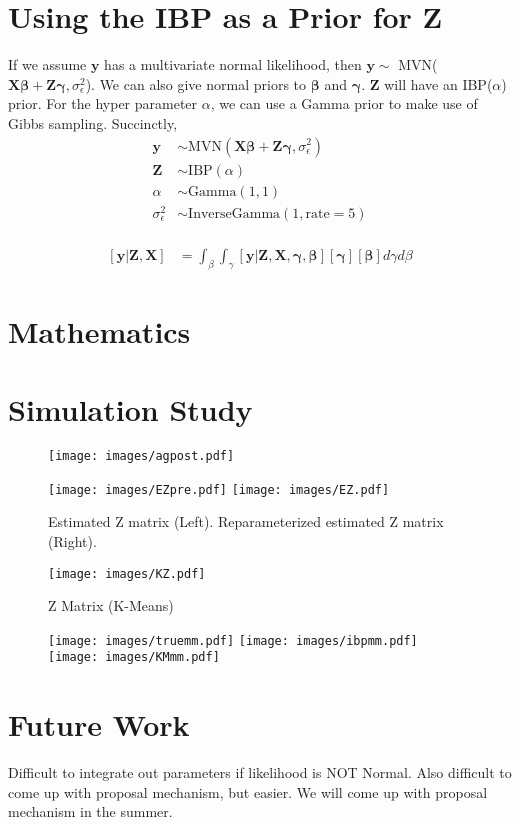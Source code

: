 \documentclass[mathserif]{article}
\def\beginmyfig{\begin{figure}[htbp]\begin{center}}
\def\endmyfig{\end{center}\end{figure}}
\newcommand{\m}[1]{\mathbf{\bm{#1}}} %
\begin{document}
\section*{Using the IBP as a Prior for Z}
If we assume $\m{y}$ has a multivariate normal likelihood, then $\m{y \sim }$
MVN($\m{X\beta+Z\gamma},\sigma_\epsilon^2$). We can also give normal priors to
$\m{\beta}$ and $\m{\gamma}$. $\m{Z}$ will have an IBP($ \alpha$) prior. For
the hyper parameter $\alpha$, we can use a Gamma prior to make use of Gibbs
sampling. Succinctly,
\begin{align*}
  \m{y} &\sim \text{MVN}(\m{X\beta+Z\gamma},\sigma_\epsilon^2)\\
  \m{Z} &\sim \text{IBP}(\alpha)\\
  \alpha &\sim \text{Gamma}(1,1)\\
  \sigma_\epsilon^2 &\sim \text{InverseGamma}(1,\text{rate}=5)\\
\end{align*}

\begin{align*}
  \m{[y|Z,X]} &= \int_\beta\int_\gamma 
                   \m{[y|Z,X,\gamma,\beta][\gamma][\beta]}
                 d\gamma d\beta
\end{align*}

\section*{Mathematics}
\section*{Simulation Study}
  \beginmyfig
    \texttt{[image: images/agpost.pdf]}
  \endmyfig  

  \beginmyfig
    \texttt{[image: images/EZpre.pdf]}
    \texttt{[image: images/EZ.pdf]}
    \vspace{-5mm}
    \caption{Estimated Z matrix (Left). Reparameterized estimated Z matrix (Right).}
  \endmyfig  



  \beginmyfig
    \texttt{[image: images/KZ.pdf]}
    \vspace{-5mm}
    \caption{Z Matrix (K-Means)}
  \endmyfig  

  \beginmyfig
    \texttt{[image: images/truemm.pdf]}
    \texttt{[image: images/ibpmm.pdf]}
    \texttt{[image: images/KMmm.pdf]}
    \vspace{-5mm}
  \endmyfig


  
       

\section*{Future Work}
Difficult to integrate out parameters if likelihood is NOT Normal.
Also difficult to come up with proposal mechanism, but easier. 
We will come up with proposal mechanism in the summer.
\end{document}
